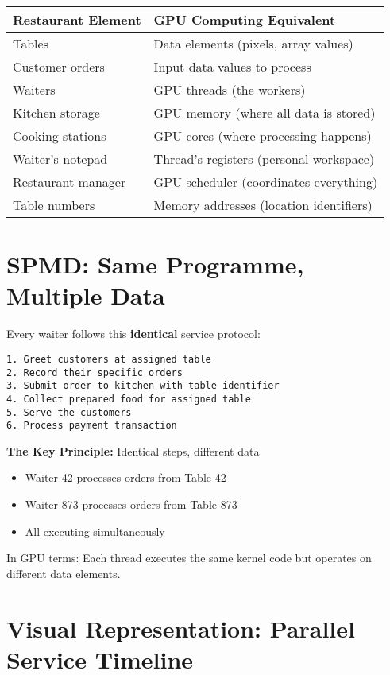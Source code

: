 \documentclass[11pt, a4paper]{article}
\begin{document}
\begin{table}[h!]
\centering
\begin{tabular}{ll}
\toprule
Restaurant Element & GPU Computing Equivalent \\
\midrule
Tables & Data elements (pixels, array values) \\
Customer orders & Input data values to process \\
Waiters & GPU threads (the workers) \\
Kitchen storage & GPU memory (where all data is stored) \\
Cooking stations & GPU cores (where processing happens) \\
Waiter's notepad & Thread's registers (personal workspace) \\
Restaurant manager & GPU scheduler (coordinates everything) \\
Table numbers & Memory addresses (location identifiers) \\
\bottomrule
\end{tabular}
\end{table}

\section*{SPMD: Same Programme, Multiple Data}

Every waiter follows this \textbf{identical} service protocol:

\begin{lstlisting}
1. Greet customers at assigned table
2. Record their specific orders
3. Submit order to kitchen with table identifier
4. Collect prepared food for assigned table
5. Serve the customers
6. Process payment transaction
\end{lstlisting}

\textbf{The Key Principle:} Identical steps, different data
\begin{itemize}
    \item Waiter 42 processes orders from Table 42
    \item Waiter 873 processes orders from Table 873
    \item All executing simultaneously
\end{itemize}

In GPU terms: Each thread executes the same kernel code but operates on different data elements.

\section*{Visual Representation: Parallel Service Timeline}
\end{document}
